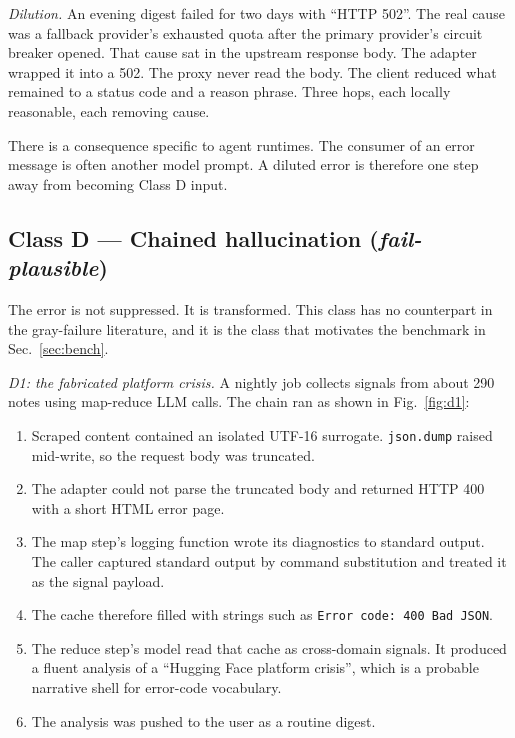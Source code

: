 \documentclass[conference]{IEEEtran}
\newcommand{\failplausible}{\emph{fail-plausible}}
\begin{document}
\emph{Dilution.} An evening digest failed for two days with ``HTTP 502''.
The real cause was a fallback provider's exhausted quota after the primary
provider's circuit breaker opened. That cause sat in the upstream response
body. The adapter wrapped it into a 502. The proxy never read the body. The
client reduced what remained to a status code and a reason phrase. Three
hops, each locally reasonable, each removing cause.

There is a consequence specific to agent runtimes. The consumer of an error
message is often another model prompt. A diluted error is therefore one step
away from becoming Class D input.

\subsection{Class D --- Chained hallucination (\failplausible{})}

The error is not suppressed. It is transformed. This class has no
counterpart in the gray-failure literature, and it is the class that
motivates the benchmark in Sec.~\ref{sec:bench}.

\emph{D1: the fabricated platform crisis.} A nightly job collects signals
from about 290 notes using map-reduce LLM calls. The chain ran as shown in
Fig.~\ref{fig:d1}:

\begin{enumerate}
  \item Scraped content contained an isolated UTF-16 surrogate.
        \texttt{json.dump} raised mid-write, so the request body was
        truncated.
  \item The adapter could not parse the truncated body and returned HTTP 400
        with a short HTML error page.
  \item The map step's logging function wrote its diagnostics to standard
        output. The caller captured standard output by command substitution
        and treated it as the signal payload.
  \item The cache therefore filled with strings such as
        \texttt{Error code: 400 Bad JSON}.
  \item The reduce step's model read that cache as cross-domain signals. It
        produced a fluent analysis of a ``Hugging Face platform crisis'',
        which is a probable narrative shell for error-code vocabulary.
  \item The analysis was pushed to the user as a routine digest.
\end{enumerate}
\end{document}
